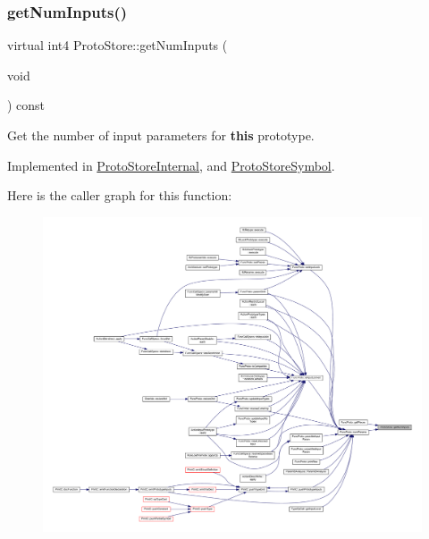 \subsubsection{\texorpdfstring{getNumInputs()}{getNumInputs()}}
{\footnotesize\ttfamily virtual int4 Proto\+Store\+::get\+Num\+Inputs (\begin{DoxyParamCaption}\item[{void}]{ }\end{DoxyParamCaption}) const\hspace{0.3cm}{\ttfamily [pure virtual]}}



Get the number of input parameters for {\bfseries{this}} prototype. 



Implemented in \mbox{\hyperlink{class_proto_store_internal_a3114aa2721c50c2ffa1bca2912d3f5ff}{Proto\+Store\+Internal}}, and \mbox{\hyperlink{class_proto_store_symbol_a26d8910259e3965c4491048935c277ec}{Proto\+Store\+Symbol}}.

Here is the caller graph for this function\+:
\nopagebreak
\begin{figure}[H]
\begin{center}
\leavevmode
\includegraphics[width=350pt]{class_proto_store_a641e1b680e3a7c67b65a964d06d60187_icgraph}
\end{center}
\end{figure}
\mbox{\label{class_proto_store_aeb240f8e1b797060196c4bb7be000197}} 
